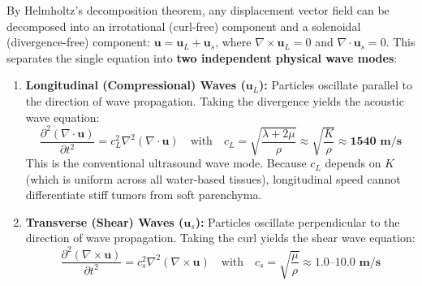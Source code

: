 \documentclass[11pt,a4paper]{article}
\begin{document}
By Helmholtz's decomposition theorem, any displacement vector field can be decomposed into an irrotational (curl-free) component and a solenoidal (divergence-free) component: $\mathbf{u} = \mathbf{u}_L + \mathbf{u}_s$, where $\nabla \times \mathbf{u}_L = 0$ and $\nabla \cdot \mathbf{u}_s = 0$. This separates the single equation into \textbf{two independent physical wave modes}:

\begin{enumerate}
    \item \textbf{Longitudinal (Compressional) Waves ($\mathbf{u}_L$):} Particles oscillate parallel to the direction of wave propagation. Taking the divergence yields the acoustic wave equation:
    \begin{equation}
        \frac{\partial^2 (\nabla \cdot \mathbf{u})}{\partial t^2} = c_L^2 \nabla^2 (\nabla \cdot \mathbf{u}) \quad \text{with} \quad c_L = \sqrt{\frac{\lambda + 2\mu}{\rho}} \approx \sqrt{\frac{K}{\rho}} \approx \mathbf{1540\text{ m/s}}
    \end{equation}
    This is the conventional ultrasound wave mode. Because $c_L$ depends on $K$ (which is uniform across all water-based tissues), longitudinal speed cannot differentiate stiff tumors from soft parenchyma.
    \item \textbf{Transverse (Shear) Waves ($\mathbf{u}_s$):} Particles oscillate perpendicular to the direction of wave propagation. Taking the curl yields the shear wave equation:
    \begin{equation}
        \frac{\partial^2 (\nabla \times \mathbf{u})}{\partial t^2} = c_s^2 \nabla^2 (\nabla \times \mathbf{u}) \quad \text{with} \quad c_s = \sqrt{\frac{\mu}{\rho}} \approx \mathbf{1.0\text{--}10.0\text{ m/s}}
    \end{equation}
\end{enumerate}
\end{document}
